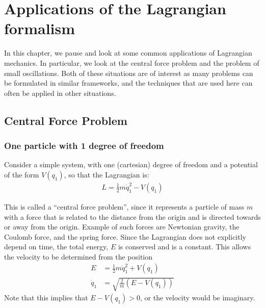 %
\chapter{Applications of the Lagrangian formalism}
\label{chap:LagrangianApplications}
In this chapter, we pause and look at some common applications of Lagrangian mechanics. In particular, we look at the central force problem and the problem of small oscillations. Both of these situations are of interest as many problems can be formulated in similar frameworks, and the techniques that are used here can often be applied in other situations.

\section{Central Force Problem}
\subsection{One particle with 1 degree of freedom}
Consider a simple system, with one (cartesian) degree of freedom and a potential of the form $V(q_1)$, so that the Lagrangian is:
\begin{align}
L=\frac{1}{2}m\dot{q}_1^2-V(q_1)
\end{align}

This is called a ``central force problem'', since it represents a particle of mass $m$ with a force that is related to the distance from the origin and is directed towards or away from the origin. Example of such forces are Newtonian gravity, the Coulomb force, and the spring force. Since the Lagrangian does not explicitly depend on time, the total energy, $E$ is conserved and is a constant. This allows the velocity to be determined from the position
\begin{align}
E&=\frac{1}{2}m\dot{q}_1^2+V(q_1)\nonumber\\
\dot{q}_1&=\sqrt{\frac{2}{m}(E-V(q_1))}
\label{eqn:consE1dof}
\end{align}
Note that this implies that $E-V(q_1)>0$, or the velocity would be imaginary. 


